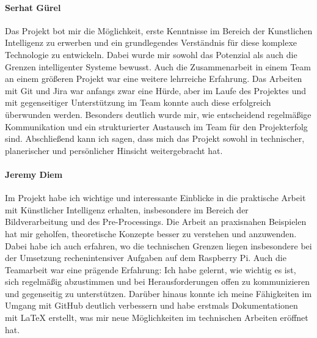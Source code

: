 \paragraph{Serhat Gürel}
Das Projekt bot mir die Möglichkeit, erste Kenntnisse im Bereich der Kunstlichen Intelligenz zu erwerben und ein grundlegendes Verständnis für diese komplexe Technologie zu entwickeln. Dabei wurde mir sowohl das Potenzial als auch die Grenzen intelligenter Systeme bewusst. Auch die Zusammenarbeit in einem Team an einem größeren Projekt war eine weitere lehrreiche Erfahrung. Das Arbeiten mit Git und Jira war anfangs zwar eine Hürde, aber im Laufe des Projektes und mit gegenseitiger Unterstützung im Team konnte auch diese erfolgreich überwunden werden. Besonders deutlich wurde mir, wie entscheidend regelmäßige Kommunikation und ein strukturierter Austausch im Team für den Projekterfolg sind. Abschließend kann ich sagen, dass mich das Projekt sowohl in technischer, planerischer und persönlicher Hinsicht weitergebracht hat.

\paragraph{Jeremy Diem}
Im Projekt habe ich wichtige und interessante Einblicke in die praktische Arbeit mit Künstlicher Intelligenz erhalten, insbesondere im Bereich der Bildverarbeitung und des Pre-Processings. Die Arbeit an praxisnahen Beispielen hat mir geholfen, theoretische Konzepte besser zu verstehen und anzuwenden. Dabei habe ich auch erfahren, wo die technischen Grenzen liegen insbesondere bei der Umsetzung rechenintensiver Aufgaben auf dem Raspberry Pi. Auch die Teamarbeit war eine prägende Erfahrung: Ich habe gelernt, wie wichtig es ist, sich regelmäßig abzustimmen und bei Herausforderungen offen zu kommunizieren und gegenseitig zu unterstützen. Darüber hinaus konnte ich meine Fähigkeiten im Umgang mit GitHub deutlich verbessern und habe erstmals Dokumentationen mit LaTeX erstellt, was mir neue Möglichkeiten im technischen Arbeiten eröffnet hat. 